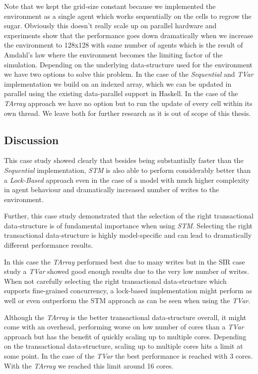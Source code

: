 Note that we kept the grid-size constant because we implemented the environment as a single agent which works sequentially on the cells to regrow the sugar. Obviously this doesn't really scale up on parallel hardware and experiments show that the performance goes down dramatically when we increase the environment to 128x128 with same number of agents which is the result of Amdahl's law where the environment becomes the limiting factor of the simulation. Depending on the underlying data-structure used for the environment we have two options to solve this problem. In the case of the \textit{Sequential} and \textit{TVar} implementation we build on an indexed array, which we can be updated in parallel using the existing data-parallel support in Haskell. In the case of the \textit{TArray} approach we have no option but to run the update of every cell within its own thread. We leave both for further research as it is out of scope of this thesis.

\subsection{Discussion}
This case study showed clearly that besides being substantially faster than the \textit{Sequential} implementation, \textit{STM} is also able to perform considerably better than a \textit{Lock-Based} approach even in the case of a model with much higher complexity in agent behaviour and dramatically increased number of writes to the environment.

Further, this case study demonstrated that the selection of the right transactional data-structure is of fundamental importance when using \textit{STM}. Selecting the right transactional data-structure is highly model-specific and can lead to dramatically different performance results.

In this case the \textit{TArray} performed best due to many writes but in the SIR case study a \textit{TVar} showed good enough results due to the very low number of writes. When not carefully selecting the right transactional data-structure which supports fine-grained concurrency, a lock-based implementation might perform as well or even outperform the STM approach as can be seen when using the \textit{TVar}.

Although the \textit{TArray} is the better transactional data-structure overall, it might come with an overhead, performing worse on low number of cores than a \textit{TVar} approach but has the benefit of quickly scaling up to multiple cores. Depending on the transactional data-structure, scaling up to multiple cores hits a limit at some point. In the case of the \textit{TVar} the best performance is reached with 3 cores. With the \textit{TArray} we reached this limit around 16 cores.


